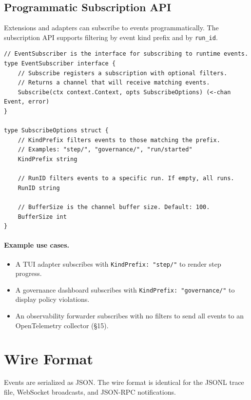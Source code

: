 \subsection{Programmatic Subscription API}

Extensions and adapters can subscribe to events programmatically. The subscription API supports filtering by event kind prefix and by \texttt{run\_id}.

\begin{verbatim}
// EventSubscriber is the interface for subscribing to runtime events.
type EventSubscriber interface {
    // Subscribe registers a subscription with optional filters.
    // Returns a channel that will receive matching events.
    Subscribe(ctx context.Context, opts SubscribeOptions) (<-chan Event, error)
}

type SubscribeOptions struct {
    // KindPrefix filters events to those matching the prefix.
    // Examples: "step/", "governance/", "run/started"
    KindPrefix string

    // RunID filters events to a specific run. If empty, all runs.
    RunID string

    // BufferSize is the channel buffer size. Default: 100.
    BufferSize int
}
\end{verbatim}

\paragraph{Example use cases.}
\begin{itemize}
  \item A TUI adapter subscribes with \texttt{KindPrefix: "step/"} to render step progress.
  \item A governance dashboard subscribes with \texttt{KindPrefix: "governance/"} to display policy violations.
  \item An observability forwarder subscribes with no filters to send all events to an OpenTelemetry collector (§15).
\end{itemize}

\section{Wire Format}

Events are serialized as JSON. The wire format is identical for the JSONL trace file, WebSocket broadcasts, and JSON-RPC notifications.


